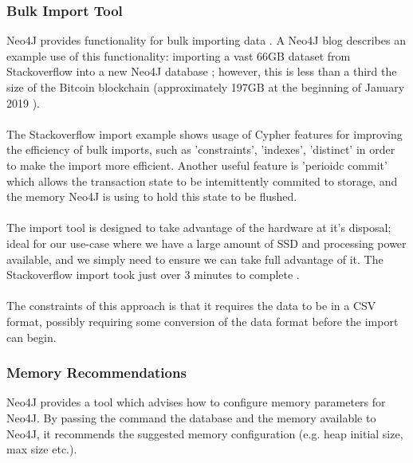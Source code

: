 \subsubsection{Bulk Import Tool}
Neo4J provides functionality for bulk importing data \cite{RefWorks:doc:5c6ab610e4b02c4a19ae3ed1}. A Neo4J blog describes an example use of this functionality: importing a  vast 66GB dataset from Stackoverflow into a new Neo4J database \cite{RefWorks:doc:5c6ab2bae4b08c9b85da964f}; however, this is less than a third the size of the Bitcoin blockchain (approximately 197GB at the beginning of January 2019 \cite{RefWorks:doc:5c6ab1a3e4b05e3aaec0ffc8}).
\\\\ 
The Stackoverflow import example shows usage of Cypher features for improving the efficiency of bulk imports, such as 'constraints', 'indexes', 'distinct'  in order to make the import more efficient. Another useful feature is 'perioidc commit' which allows the transaction state to be intemittently commited to storage, and the memory Neo4J is using to hold this state to be flushed. 
\\\\
The import tool is designed to take advantage of the hardware at it's disposal; ideal for our use-case where we have a large amount of SSD and processing power available, and we simply need to ensure we can take full advantage of it. The Stackoverflow import took just over 3 minutes to complete \cite{RefWorks:doc:5c6ab2bae4b08c9b85da964f}. 
\\\\
The constraints of this approach is that it requires the data to be in a CSV format, possibly requiring some conversion of the data format before the import can begin. 

\subsubsection{Memory Recommendations}
Neo4J provides a tool which advises how to configure memory parameters for Neo4J. By passing the command the database and the memory available to Neo4J, it recommends the suggested memory configuration (e.g. heap initial size, max size etc.). 
